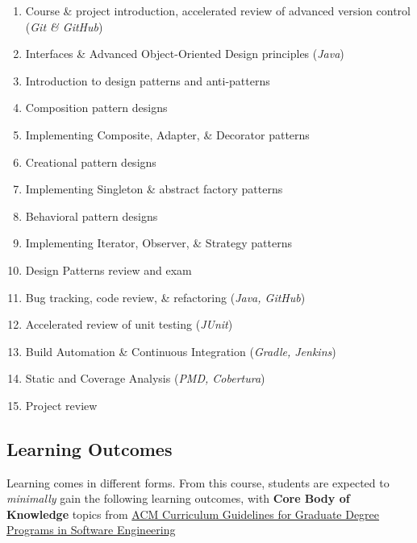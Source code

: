 \documentclass[12pt]{article}
\begin{document}
  \begin{enumerate}
    \item Course \& project introduction, accelerated review of advanced version control (\textit{Git \& GitHub})
    \item Interfaces \& Advanced Object-Oriented Design principles (\textit{Java})
    \item Introduction to design patterns and anti-patterns
    \item Composition pattern designs
    \item Implementing Composite, Adapter, \& Decorator patterns
    \item Creational pattern designs
    \item Implementing Singleton \& abstract factory patterns
    \item Behavioral pattern designs
    \item Implementing Iterator, Observer, \& Strategy patterns
    \item Design Patterns review and exam
    \item Bug tracking, code review, \& refactoring (\textit{Java, GitHub})
    \item Accelerated review of unit testing (\textit{JUnit})
    \item Build Automation \& Continuous Integration (\textit{Gradle, Jenkins})
    \item Static and Coverage Analysis (\textit{PMD, Cobertura})
    \item Project review
  \end{enumerate}

  \newpage
  \subsection*{Learning Outcomes}
  \noindent
  Learning comes in different forms. From this course, students are expected to \textit{minimally} gain the following learning outcomes, with \textbf{Core Body of Knowledge} topics from \href{https://www.acm.org/binaries/content/assets/education/gsew2009.pdf}{ACM Curriculum Guidelines for Graduate Degree Programs in Software Engineering}
\end{document}
